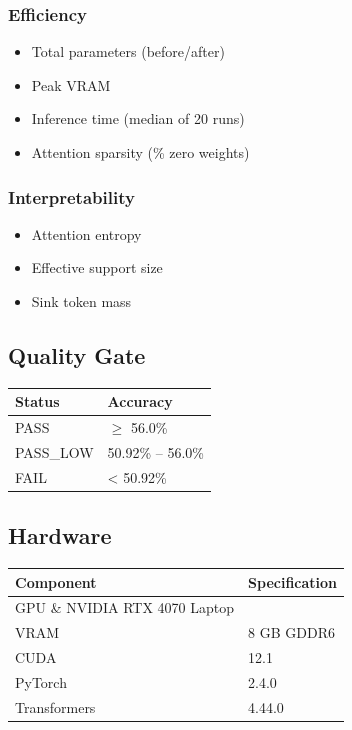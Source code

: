 \subsubsection{Efficiency}
\begin{itemize}
\item Total parameters (before/after)
\item Peak VRAM
\item Inference time (median of 20 runs)
\item Attention sparsity (\% zero weights)

\end{itemize}
\subsubsection{Interpretability}
\begin{itemize}
\item Attention entropy
\item Effective support size
\item Sink token mass

\end{itemize}
\subsection{Quality Gate}

\begin{table}[H]
\centering
\small
\begin{tabular}{ll}
\toprule
\textbf{Status} & \textbf{Accuracy} \\
\midrule
PASS & $\ge$ 56.0\% \\
PASS\_LOW & 50.92\% -- 56.0\% \\
FAIL & < 50.92\% \\
\bottomrule
\end{tabular}
\end{table}

\subsection{Hardware}

\begin{table}[H]
\centering
\small
\begin{tabular}{ll}
\toprule
\textbf{Component} & \textbf{Specification} \\
\midrule
GPU \& NVIDIA RTX 4070 Laptop \\
VRAM & 8 GB GDDR6 \\
CUDA & 12.1 \\
PyTorch & 2.4.0 \\
Transformers & 4.44.0 \\
\bottomrule
\end{tabular}
\end{table}

